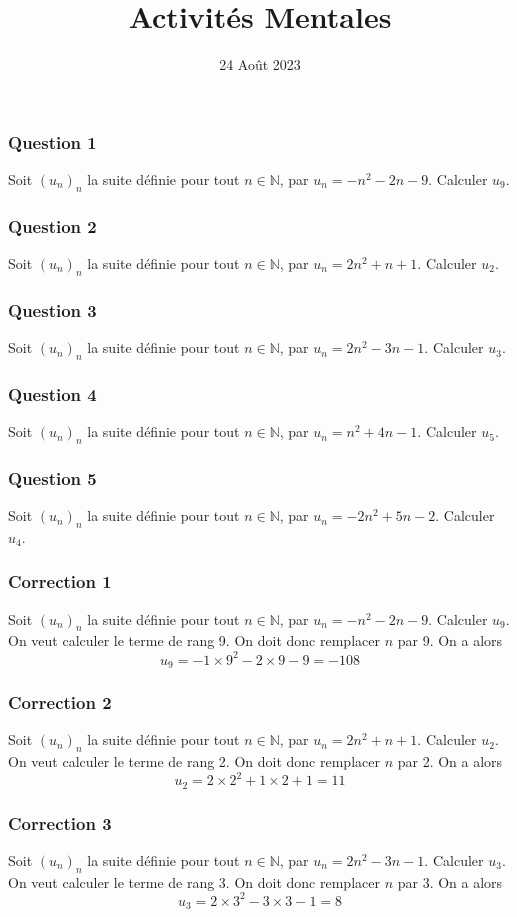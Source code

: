 \documentclass[15pt, mathserif]{beamer}
\title{Activités Mentales}
\date{24 Août 2023}
\newcommand{\N}{\mathbb{N}}			%
\begin{document}
\begin{frame}
    \titlepage
\end{frame}

\begin{frame} 
	\frametitle{Question 1}
Soit $(u_n)_n$ la suite définie pour tout $n \in \N$, par $u_n=-n^2-2n-9$. Calculer $u_{9}$.\end{frame}


\begin{frame} 
	\frametitle{Question 2}
Soit $(u_n)_n$ la suite définie pour tout $n \in \N$, par $u_n=2n^2+n+1$. Calculer $u_{2}$.\end{frame}


\begin{frame} 
	\frametitle{Question 3}
Soit $(u_n)_n$ la suite définie pour tout $n \in \N$, par $u_n=2n^2-3n-1$. Calculer $u_{3}$.\end{frame}


\begin{frame} 
	\frametitle{Question 4}
Soit $(u_n)_n$ la suite définie pour tout $n \in \N$, par $u_n=n^2+4n-1$. Calculer $u_{5}$.\end{frame}


\begin{frame} 
	\frametitle{Question 5}
Soit $(u_n)_n$ la suite définie pour tout $n \in \N$, par $u_n=-2n^2+5n-2$. Calculer $u_{4}$.\end{frame}


\begin{frame}
\vspace{-10mm}
	\frametitle{Correction 1}
Soit $(u_n)_n$ la suite définie pour tout $n \in \N$, par $u_n=-n^2-2n-9$. Calculer $u_{9}$. 
 \vfil 
  On veut calculer le terme de rang 9. 
 \vfil 
 On doit donc remplacer $n$ par 9. On a alors $$u_{9}=-1\times 9^2-2\times9-9=-108$$\end{frame}


\begin{frame}
\vspace{-10mm}
	\frametitle{Correction 2}
Soit $(u_n)_n$ la suite définie pour tout $n \in \N$, par $u_n=2n^2+n+1$. Calculer $u_{2}$. 
 \vfil 
  On veut calculer le terme de rang 2. 
 \vfil 
 On doit donc remplacer $n$ par 2. On a alors $$u_{2}=2\times 2^2+1\times2+1=11$$\end{frame}


\begin{frame}
\vspace{-10mm}
	\frametitle{Correction 3}
Soit $(u_n)_n$ la suite définie pour tout $n \in \N$, par $u_n=2n^2-3n-1$. Calculer $u_{3}$. 
 \vfil 
  On veut calculer le terme de rang 3. 
 \vfil 
 On doit donc remplacer $n$ par 3. On a alors $$u_{3}=2\times 3^2-3\times3-1=8$$\end{frame}
\end{document}
